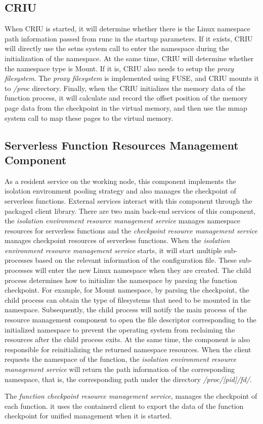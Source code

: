 \subsection{CRIU}
When CRIU is started, 
it will determine whether there is the Linux namespace path information passed from runc in the startup parameters. 
If it exists, 
CRIU will directly use the setns system call to enter the namespace during the initialization of the namespace. 
At the same time, 
CRIU will determine whether the namespace type is Mount. 
If it is, CRIU also needs to setup the \textit{proxy filesystem}. 
The \textit{proxy filesystem} is implemented using FUSE\cite{fuse}, 
and CRIU mounts it to \textit{/proc} directory. 
Finally, when the CRIU initializes the memory data of the function process, 
it will calculate and record the offset position of the memory page data from the checkpoint in the virtual memory, 
and then use the mmap system call to map these pages to the virtual memory. 

\subsection{Serverless Function Resources Management Component}

As a resident service on the working node, 
this component implements the isolation environment pooling strategy and also manages the checkpoint of serverless functions. 
External services interact with this component through the packaged client library. 
There are two main back-end services of this component, 
the \textit{isolation environment resource management service} 
manages namespace resources for serverless functions 
and the \textit{checkpoint resource management service} manages
checkpoint resources of serverless functions.
When the \textit{isolation environment resource management service} starts, 
it will start multiple sub-processes based on the relevant information of the configuration file. 
These sub-processes will enter the new Linux namespace when they are created. 
The child process determines how to initialize 
the namespace by parsing the function checkpoint. 
For example, for Mount namespace, 
by parsing the checkpoint, 
the child process can obtain the type of filesystems 
that need to be mounted in the namespace. 
Subsequently, 
the child process will notify the main process of the resource management component 
to open the file descriptor corresponding to the initialized namespace 
to prevent the operating system from reclaiming the 
resources after the child process exits. 
At the same time, the component is also responsible for 
reinitializing the returned namespace resources. 
When the client requests the namespace of the function, 
the \textit{isolation environment resource management service} will return 
the path information of the corresponding namespace, 
that is, the corresponding path under the directory \textit{/proc/[pid]/fd/}. 

The \textit{function checkpoint resource management service}, 
manages the checkpoint of each function. 
it uses the containerd client to export the data of 
the function checkpoint for unified management when it is started.